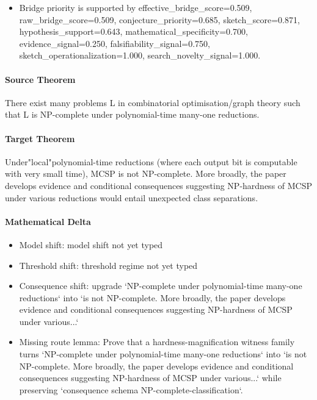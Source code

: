 \documentclass[11pt]{article}
\begin{document}
\begin{itemize}
\item Bridge priority is supported by effective\_bridge\_score=0.509, raw\_bridge\_score=0.509, conjecture\_priority=0.685, sketch\_score=0.871, hypothesis\_support=0.643, mathematical\_specificity=0.700, evidence\_signal=0.250, falsifiability\_signal=0.750, sketch\_operationalization=1.000, search\_novelty\_signal=1.000.
\end{itemize}
\paragraph{Source Theorem}
There exist many problems L in combinatorial optimisation/graph theory such that L is NP-complete under polynomial-time many-one reductions.
\paragraph{Target Theorem}
Under"local"polynomial-time reductions (where each output bit is computable with very small time), MCSP is not NP-complete. More broadly, the paper develops evidence and conditional consequences suggesting NP-hardness of MCSP under various reductions would entail unexpected class separations.
\paragraph{Mathematical Delta}
\begin{itemize}
\item Model shift: model shift not yet typed
\item Threshold shift: threshold regime not yet typed
\item Consequence shift: upgrade `NP-complete under polynomial-time many-one reductions` into `is not NP-complete. More broadly, the paper develops evidence and conditional consequences suggesting NP-hardness of MCSP under various...`
\item Missing route lemma: Prove that a hardness-magnification witness family turns `NP-complete under polynomial-time many-one reductions` into `is not NP-complete. More broadly, the paper develops evidence and conditional consequences suggesting NP-hardness of MCSP under various...` while preserving `consequence schema NP-complete-classification`.
\end{itemize}
\end{document}
